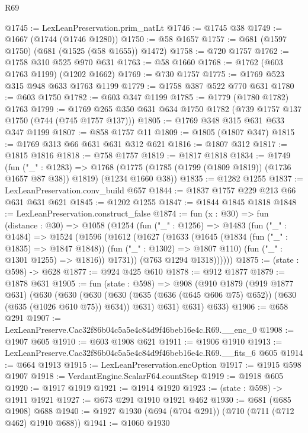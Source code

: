 \begin{lexlean}{R69}
\begin{coremodule}
@1745 := LexLeanPreservation.prim_natLt
@1746 := @1745 @38
@1749 := @1667 (@1744 (@1746 @1280))
@1750 := @58 @1657
@1757 := @681 (@1597 @1750) (@681 (@1525 (@58 @1655)) @1472)
@1758 := @720 @1757
@1762 := @1758 @310 @525 @970 @631
@1763 := @58 @1660
@1768 := @1762 (@603 @1763 @1199) (@1202 @1662)
@1769 := @730 @1757
@1775 := @1769 @523 @315 @948 @633 @1763 @1199
@1779 := @1758 @387 @522 @770 @631
@1780 := @603 @1750
@1782 := @603 @347 @1199
@1785 := @1779 (@1780 @1782) @1763
@1799 := @1769 @265 @350 @631 @634 @1750 @1782 (@739 @1757 @137 @1750 (@744 (@745 @1757 @137)))
@1805 := @1769 @348 @315 @631 @633 @347 @1199
@1807 := @858 @1757 @11
@1809 := @1805 (@1807 @347)
@1815 := @1769 @313 @66 @631 @631 @312 @621
@1816 := @1807 @312
@1817 := @1815 @1816
@1818 := @758 @1757
@1819 := @1817 @1818
@1834 := @1749
    (fun ("_" : @1283) =>
    @1768 (@1775 (@1785 (@1799 (@1809 @1819)) (@1736 @1657 @87 @38)) @1819) (@1234 @1660 @38))
@1835 := @1282 @1255
@1837 := LexLeanPreservation.conv_build @657
@1844 := @1837 @1757 @229 @213 @66 @631 @631 @621
@1845 := @1202 @1255
@1847 := @1844 @1845 @1818
@1848 := LexLeanPreservation.construct_false
@1874 := fun (x : @30) =>
  fun (distance : @30) =>
  @1058
    (@1254
      (fun ("_" : @1256) =>
      @1483
        (fun ("_" : @1484) =>
        @1524
          (@1596
            (@1612
              (@1627
                (@1633
                  (@1645
                    (@1834 (fun ("_" : @1835) => @1847 @1848))
                    (fun ("_" : @1302) => @1807 @110)
                    (fun ("_" : @1301 @1255) => @1816))
                  @1731))
              (@763 @1294 @1318))))))
@1875 := (state : @598) -> @628
@1877 := @924 @425 @610
@1878 := @912 @1877
@1879 := @1878 @631
@1905 := fun (state : @598) =>
  @908
    (@910
      @1879
      (@919 @1877 @631)
      (@630
        (@630
          (@630 (@630 (@635 (@636 (@645 @606 @75) @652)) (@630 (@635 (@1026 @610 @75)) @634)) @631)
          @631)
        @631)
      @633)
@1906 := @658 @291
@1907 := LexLeanPreserve.Cac32f86b04c5a5e4c84d9f46beb16e4c.R69.__enc_0
@1908 := @1907 @605
@1910 := @603 @1908 @621
@1911 := @1906 @1910
@1913 := LexLeanPreserve.Cac32f86b04c5a5e4c84d9f46beb16e4c.R69.__fits_6 @605
@1914 := @664 @1913
@1915 := LexLeanPreservation.encOption
@1917 := @1915 @598 @1907
@1918 := VerdantEngine.ScalarF64.countStep
@1919 := @1918 @605
@1920 := @1917 @1919
@1921 := @1914 @1920
@1923 := (state : @598) -> @1911 @1921
@1927 := @673 @291 @1910 @1921 @462
@1930 := @681 (@685 @1908) @688
@1940 := @1927 @1930 (@694 (@704 @291)) (@710 (@711 (@712 @462) @1910 @688))
@1941 := @1060 @1930

\end{coremodule}
\end{lexlean}

